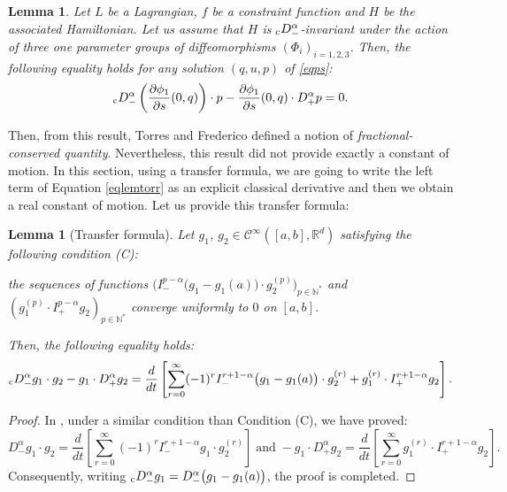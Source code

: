 \documentclass[english,11pt,reqno]{smfart}
\newtheorem{lemma}[theorem]{Lemma}
\def\di{\displaystyle}
\newcommand{\N}{\mathbb{N}}
\newcommand{\R}{\mathbb{R}}
\newcommand{\CC}{\mathscr{C}}
\newcommand{\cDM}{{}_{{\rm c}} D^\alpha_-}
\newcommand{\DM}{D^\alpha_-}
\newcommand{\DP}{D^\alpha_+}
\begin{document}
\begin{lemma}\label{lemtorr}
Let $L$ be a Lagrangian, $f$ be a constraint function and $H$ be the associated Hamiltonian. Let us assume that $H$ is $\cDM$-invariant under the action of three one parameter groups of diffeomorphisms $(\Phi_i)_{i=1,2,3}$. Then, the following equality holds for any solution $(q,u,p)$ of \eqref{eqps}:
\begin{equation}\label{eqlemtorr}
\cDM \left( \dfrac{\partial \phi_1}{\partial s} (0,q) \right) \cdot p - \dfrac{\partial \phi_1}{\partial s} (0,q) \cdot \DP p = 0.
\end{equation}
\end{lemma}

Then, from this result, Torres and Frederico defined a notion of \textit{fractional-conserved quantity}. Nevertheless, this result did not provide exactly a constant of motion. In this section, using a transfer formula, we are going to write the left term of Equation \eqref{eqlemtorr} as an explicit classical derivative and then we obtain a real constant of motion. Let us provide this transfer formula:

\begin{lemma}[Transfer formula]\label{lemtransfer}
Let $g_1$, $g_2 \in \CC^{\infty} ([a,b],\R^d)$ satisfying the following condition {\rm (C)}:
\begin{center}
the sequences of functions $ \big( I^{p-\alpha}_- \big(g_1-g_1(a)\big) \cdot g_2^{(p)} \big)_{p \in \N^*} $ and \\ $ ( g_1^{(p)} \cdot I^{p-\alpha}_+ g_2 )_{p \in \N^*} $ converge uniformly to $0$ on $ [a,b] $.
\end{center}
Then, the following equality holds:
\begin{equation}\label{eqlemtransfer}
\cDM g_1 \cdot g_2 - g_1 \cdot \DP g_2 = \dfrac{d}{dt} \left[ \di \sum_{r=0}^{\infty} (-1)^r I^{r+1-\alpha}_- \big(g_1-g_1(a)\big) \cdot g_2^{(r)} + g_1^{(r)} \cdot I^{r+1-\alpha}_+ g _2\right]. 
\end{equation}
\end{lemma}

\begin{proof}
In \cite{bour2}, under a similar condition than Condition {\rm (C)}, we have proved:
\begin{equation}\label{}
\DM g_1 \cdot g_2 = \dfrac{d}{dt} \left[ \di \sum_{r=0}^{\infty} (-1)^r I^{r+1-\alpha}_- g_1 \cdot g_2^{(r)} \right] \; \text{and} \; - g_1 \cdot \DP g_2 = \dfrac{d}{dt} \left[ \di \sum_{r=0}^{\infty} g_1^{(r)} \cdot I^{r+1-\alpha}_+ g _2\right]. 
\end{equation}
Consequently, writing $\cDM g_1 = \DM \big( g_1 - g_1(a) \big)$, the proof is completed. 
\end{proof}
\end{document}

